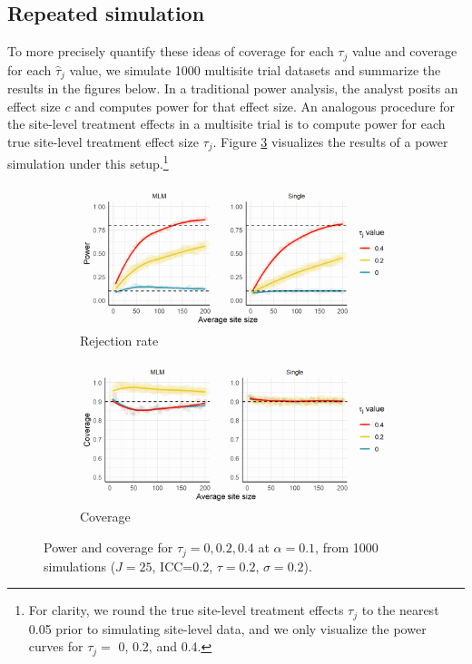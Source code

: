 \documentclass[]{article}
\begin{document}
\subsection{Repeated simulation}

To more precisely quantify these ideas of coverage for each $\tau_j$ value and coverage for each $\hat{\tau}_j$ value, we simulate 1000 multisite trial datasets and summarize the results in the figures below.
In a traditional power analysis, the analyst posits an effect size $c$ and computes power for that effect size.
An analogous procedure for the site-level treatment effects in a multisite trial is to compute power for each true site-level treatment effect size $\tau_j$.
Figure \ref{fig:pcp1} visualizes the results of a power simulation under this setup.\footnote{For clarity, we round the true site-level treatment effects $\tau_j$ to the nearest 0.05 prior to simulating site-level data, and we only visualize the power curves for $\tau_j =$ 0, 0.2, and 0.4.}
\begin{figure}[ht]
    \centering
    \begin{subfigure}[a]{\textwidth}
    	\includegraphics[width=\textwidth]{pp1}
        \caption{Rejection rate}
    	\label{fig:pp1}
    \end{subfigure}
    \vfill
    \begin{subfigure}[b]{\textwidth}
    	\includegraphics[width=\textwidth]{cp1}
        \caption{Coverage}
    	\label{fig:cp1}
    \end{subfigure}
    \caption{Power and coverage for $\tau_j = 0, 0.2, 0.4$ at $\alpha=0.1$, from 1000 simulations ($J=25$, ICC=0.2, $\tau=0.2$, $\sigma=0.2$).}
    \label{fig:pcp1}
\end{figure}
\end{document}
